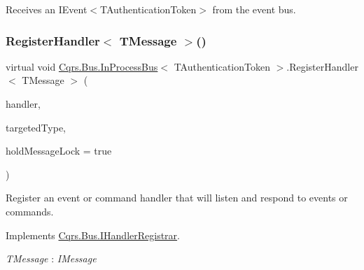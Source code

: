 Receives an I\+Event$<$\+T\+Authentication\+Token$>$ from the event bus. 

\mbox{\label{classCqrs_1_1Bus_1_1InProcessBus_aa14a00defdf2d48b2d0e6a65dbdb12d9_aa14a00defdf2d48b2d0e6a65dbdb12d9}} 
\subsubsection{\texorpdfstring{Register\+Handler$<$ T\+Message $>$()}{RegisterHandler< TMessage >()}\hspace{0.1cm}{\footnotesize\ttfamily [1/2]}}
{\footnotesize\ttfamily virtual void \hyperlink{classCqrs_1_1Bus_1_1InProcessBus}{Cqrs.\+Bus.\+In\+Process\+Bus}$<$ T\+Authentication\+Token $>$.Register\+Handler$<$ T\+Message $>$ (\begin{DoxyParamCaption}\item[{Action$<$ T\+Message $>$}]{handler,  }\item[{Type}]{targeted\+Type,  }\item[{bool}]{hold\+Message\+Lock = {\ttfamily true} }\end{DoxyParamCaption})\hspace{0.3cm}{\ttfamily [virtual]}}



Register an event or command handler that will listen and respond to events or commands. 



Implements \hyperlink{interfaceCqrs_1_1Bus_1_1IHandlerRegistrar_ab6ca4dfdc54a5aeebe4651dbdb479f55_ab6ca4dfdc54a5aeebe4651dbdb479f55}{Cqrs.\+Bus.\+I\+Handler\+Registrar}.

\begin{Desc}
\item[Type Constraints]\begin{description}
\item[{\em T\+Message} : {\em I\+Message}]\end{description}
\end{Desc}
\mbox{\label{classCqrs_1_1Bus_1_1InProcessBus_a62171e3c6d155cfdfd921b07b4909adf_a62171e3c6d155cfdfd921b07b4909adf}} 
